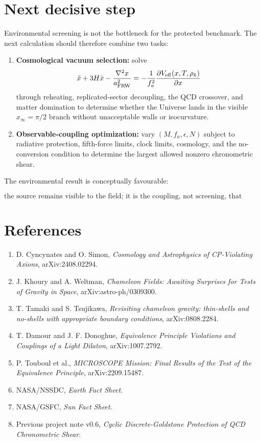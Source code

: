 \documentclass[11pt,a4paper]{article}
\providecommand{\tightlist}{\setlength{\itemsep}{0pt}\setlength{\parskip}{0pt}}
\begin{document}
\section{Next decisive step}\label{next-decisive-step}

Environmental screening is not the bottleneck for the protected
benchmark. The next calculation should therefore combine two tasks:

\begin{enumerate}
\def\labelenumi{\arabic{enumi}.}
\tightlist
\item
  \textbf{Cosmological vacuum selection:} solve \[
  \ddot x+3H\dot x-\frac{\nabla^2x}{a_{\rm FRW}^2}
  =-\frac{1}{f_a^2}\frac{\partial V_{\rm eff}(x,T,\rho_k)}{\partial x}
  \] through reheating, replicated-sector decoupling, the QCD crossover,
  and matter domination to determine whether the Universe lands in the
  visible \(x_\infty=\pi/2\) branch without unacceptable walls or
  isocurvature.
\item
  \textbf{Observable-coupling optimization:} vary \((M,f_a,\epsilon,N)\)
  subject to radiative protection, fifth-force limits, clock limits,
  cosmology, and the no-conversion condition to determine the largest
  allowed nonzero chronometric shear.
\end{enumerate}

The environmental result is conceptually favourable:

\[
\boxed{
\text{the source remains visible to the field; it is the coupling, not screening, that limits the signal.}
}
\]



\section{References}\label{references}

\begin{enumerate}
\def\labelenumi{\arabic{enumi}.}
\tightlist
\item
  D. Cyncynates and O. Simon, \emph{Cosmology and Astrophysics of
  CP-Violating Axions}, arXiv:2408.02294.
\item
  J. Khoury and A. Weltman, \emph{Chameleon Fields: Awaiting Surprises
  for Tests of Gravity in Space}, arXiv:astro-ph/0309300.
\item
  T. Tamaki and S. Tsujikawa, \emph{Revisiting chameleon gravity:
  thin-shells and no-shells with appropriate boundary conditions},
  arXiv:0808.2284.
\item
  T. Damour and J. F. Donoghue, \emph{Equivalence Principle Violations
  and Couplings of a Light Dilaton}, arXiv:1007.2792.
\item
  P. Touboul et al., \emph{MICROSCOPE Mission: Final Results of the Test
  of the Equivalence Principle}, arXiv:2209.15487.
\item
  NASA/NSSDC, \emph{Earth Fact Sheet}.
\item
  NASA/GSFC, \emph{Sun Fact Sheet}.
\item
  Previous project note v0.6, \emph{Cyclic Discrete-Goldstone Protection
  of QCD Chronometric Shear}.
\end{enumerate}
\end{document}
